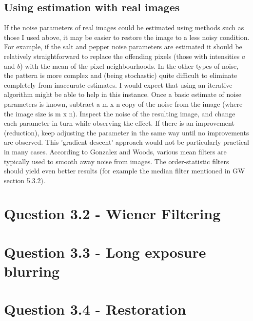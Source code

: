 \documentclass{article}
\begin{document}
\subsection*{Using estimation with real images}
If the noise parameters of real images could be estimated using methods such as those I used above, it may be easier to restore the image to a less noisy condition. For example, if the salt and pepper noise parameters are estimated it should be relatively straightforward to replace the offending pixels (those with intensities $a$ and $b$) with the mean of the pixel neighbourhoods.
In the other types of noise, the pattern is more complex and (being stochastic) quite difficult to eliminate completely from inaccurate estimates. I would expect that using an iterative algorithm might be able to help in this instance. Once a basic estimate of noise parameters is known, subtract a m x n copy of the noise from the image (where the image size is m x n). Inspect the noise of the resulting image, and change each parameter in turn while observing the effect. If there is an improvement (reduction), keep adjusting the parameter in the same way until no improvements are observed. This 'gradient descent' approach would not be particularly practical in many cases. According to Gonzalez and Woods, various mean filters are typically used to smooth away noise from images. The order-statistic filters should yield even better results (for example the median filter mentioned in GW section 5.3.2).


\section*{Question 3.2 - Wiener Filtering}

\section*{Question 3.3 - Long exposure blurring}

\section*{Question 3.4 - Restoration}
\end{document}
